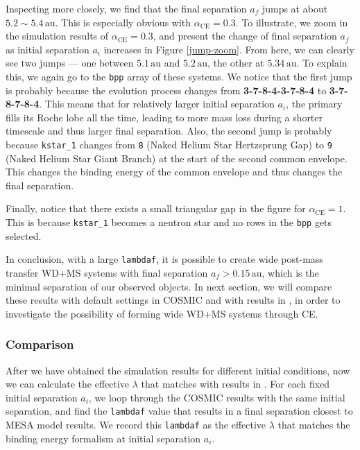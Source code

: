 \documentclass[12pt]{article}
\newcommand{\alphace}{\alpha_{\mathrm{CE}}}
\newcommand{\au}{\, \mathrm{au}}
\begin{document}
Inspecting more closely, we find that the final separation $a_f$ jumps at about $5.2 \sim 5.4 \au$. This is especially obvious with $\alphace = 0.3$. To illustrate, we zoom in the simulation results of $\alphace = 0.3$, and present the change of final separation $a_f$ as initial separation $a_i$ increases in Figure \ref{jump-zoom}. From here, we can clearly see two jumps — one between $5.1\au$ and $5.2\au$, the other at $5.34\au$. To explain this, we again go to the \verb|bpp| array of these systems. We notice that the first jump is probably because the evolution process changes from \textbf{3-7-8-4-3-7-8-4} to \textbf{3-7-8-7-8-4}. This means that for relatively larger initial separation $a_i$, the primary fills its Roche lobe all the time, leading to more mass loss during a shorter timescale and thus larger final separation. Also, the second jump is probably because \verb|kstar_1| changes from \verb|8| (Naked Helium Star Hertzsprung Gap) to \verb|9| (Naked Helium Star Giant Branch) at the start of the second common envelope. This changes the binding energy of the common envelope and thus changes the final separation.

Finally, notice that there exists a small triangular gap in the figure for $\alphace = 1$. This is because \verb|kstar_1| becomes a neutron star and no rows in the \verb|bpp| gets selected.

In conclusion, with a large \verb|lambdaf|, it is possible to create wide post-mass transfer WD+MS systems with final separation $a_f > 0.15 \au$, which is the minimal separation of our observed objects. In next section, we will compare these results with default settings in COSMIC and with results in \cite{yamaguchi_hi}, in order to investigate the possibility of forming wide WD+MS systems through CE.

\subsubsection{Comparison}
After we have obtained the simulation results for different initial conditions, now we can calculate the effective $\lambda$ that matches with results in \cite{yamaguchi_hi}. For each fixed initial separation $a_i$, we loop through the COSMIC results with the same initial separation, and find the \verb|lambdaf| value that results in a final separation closest to MESA model results. We record this \verb|lambdaf| as the effective $\lambda$ that matches the binding energy formalism at initial separation $a_i$.
\end{document}
